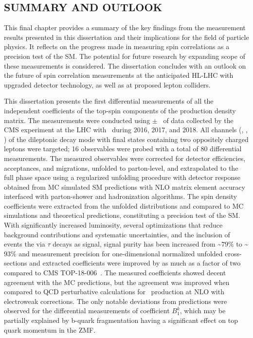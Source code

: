 \begin{refsection}

\chapter{SUMMARY AND OUTLOOK}
\label{Conclusion}

\begin{cabstract}
This final chapter provides a summary of the key findings from the measurement results presented in this dissertation and their implications for the field of particle physics. 
It reflects on the progress made in measuring \ttbar spin correlations as a precision test of the SM. 
The potential for future research by expanding scope of these measurements is considered.
The dissertation concludes with an outlook on the future of \ttbar spin correlation measurements at the anticipated HL-LHC with upgraded detector technology, as well as at proposed lepton colliders.
\end{cabstract}


This dissertation presents the first differential measurements of all the independent coefficients of the top-spin components of the \ttbar production density matrix.
The measurements were conducted using \lumivalueRuniiUL $\pm$ \lumierrRuniiUL\ of data collected by the CMS experiment at the LHC with \beamenergy\ during 2016, 2017, and 2018.
All channels (\ee, \emu, \mumu) of the \ttbar dileptonic decay mode with final states containing two oppositely charged leptons were targeted; 16 observables were probed with a total of 80 differential measurements.
The measured observables were corrected for detector efficiencies, acceptances, and migrations, unfolded to parton-level, and extrapolated to the full phase space using a regularized unfolding procedure with detector response obtained from MC simulated SM predictions with NLO matrix element accuracy interfaced with parton-shower and hadronization algorithms.
The spin density coefficients were extracted from the unfolded distributions and compared to MC simulations and theoretical predictions, constituting a precision test of the SM. 
With significantly increased luminosity, several optimizations that reduce background contributions and systematic uncertainties, and the inclusion of \ttbar events the via $\tau$ decays as signal, signal purity has been increased from \sim$79\%$ to \sim$93\%$ and measurement precision for one-dimensional normalized unfolded cross-sections and extracted coefficients were improved by as much as a factor of two compared to CMS TOP-18-006~\cite{Sirunyan:2681777}.
The measured coefficients showed decent agreement with the MC predictions, but the agreement was improved when compared to QCD perturbative calculations for \ttbar\ production at NLO with electroweak corrections.
The only notable deviations from predictions were observed for the differential measurements of coefficient $B_{1}^{k}$, which may be partially explained by b-quark fragmentation having a significant effect on top quark momentum in the \ttbar ZMF.


\end{refsection}

